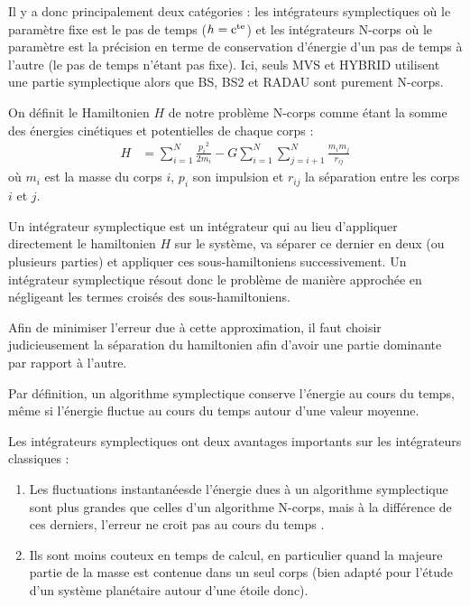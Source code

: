 Il y a donc principalement deux catégories : les intégrateurs symplectiques où le paramètre fixe est le pas de temps ($h=\mathrm{c^{te}}$) et les intégrateurs N-corps où le paramètre est la précision en terme de conservation d'énergie d'un pas de temps à l'autre (le pas de temps n'étant pas fixe). Ici, seuls MVS et HYBRID utilisent une partie symplectique alors que BS, BS2 et RADAU sont purement N-corps.

\bigskip

On définit le Hamiltonien $H$ de notre problème N-corps comme étant la somme des énergies cinétiques et potentielles de chaque corps : 
\begin{align}
H &= \sum_{i=1}^N\frac{{p_i}^2}{2m_i} -G\sum_{i=1}^N\sum_{j=i+1}^N\frac{m_im_j}{r_{ij}}
\end{align}
où $m_i$ est la masse du corps $i$, $p_i$ son impulsion et $r_{ij}$ la séparation entre les corps $i$ et $j$.

Un intégrateur symplectique est un intégrateur qui au lieu d'appliquer directement le hamiltonien $H$ sur le système, va séparer ce dernier en deux (ou plusieurs parties) et appliquer ces sous-hamiltoniens successivement. Un intégrateur symplectique résout donc le problème de manière approchée en négligeant les termes croisés des sous-hamiltoniens.

Afin de minimiser l'erreur due à cette approximation, il faut choisir judicieusement la séparation du hamiltonien afin d'avoir une partie dominante par rapport à l'autre.

Par définition, un algorithme symplectique conserve l'énergie au cours du temps, même si l'énergie fluctue au cours du temps autour d'une valeur moyenne. 

Les intégrateurs symplectiques ont deux avantages importants sur les intégrateurs classiques : 
\begin{enumerate}
\item Les fluctuations \og instantanées\fg de l'énergie dues à un algorithme symplectique sont plus grandes que celles d'un
algorithme N-corps, mais à la différence de ces derniers, l'erreur ne croit pas au cours du temps .
\item Ils sont moins couteux en temps de calcul, en particulier quand la majeure partie de la masse est contenue dans un seul corps (bien adapté pour l'étude d'un système planétaire autour d'une étoile donc).
\end{enumerate}

